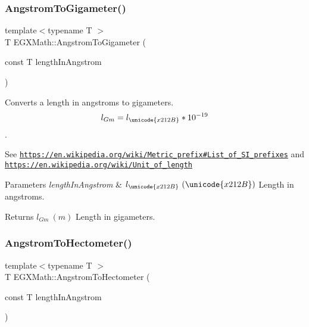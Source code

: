 \subsubsection{\texorpdfstring{Angstrom\+To\+Gigameter()}{AngstromToGigameter()}}
{\footnotesize\ttfamily template$<$typename T $>$ \\
T E\+G\+X\+Math\+::\+Angstrom\+To\+Gigameter (\begin{DoxyParamCaption}\item[{const T}]{length\+In\+Angstrom }\end{DoxyParamCaption})}



Converts a length in angstroms to gigameters. \[ l_{Gm}=l_{\unicode{x212B}} * 10^{-19} \]. 

See \href{https://en.wikipedia.org/wiki/Metric_prefix#List_of_SI_prefixes}{\tt https\+://en.\+wikipedia.\+org/wiki/\+Metric\+\_\+prefix\#\+List\+\_\+of\+\_\+\+S\+I\+\_\+prefixes} and \href{https://en.wikipedia.org/wiki/Unit_of_length}{\tt https\+://en.\+wikipedia.\+org/wiki/\+Unit\+\_\+of\+\_\+length} 
\begin{DoxyParams}{Parameters}
{\em length\+In\+Angstrom} & $ l_{\unicode{x212B}}\ (\unicode{x212B})$ Length in angstroms. \\
\hline
\end{DoxyParams}
\begin{DoxyReturn}{Returns}
$ l_{Gm}\ (m)$ Length in gigameters. 
\end{DoxyReturn}
\mbox{\label{group___e_g_x_math-_conversions-_length_conversions-_non-_s_i-_angstrom-_s_i_ga0f6fad35867be49511009edfdb4b7a0a}} 
\subsubsection{\texorpdfstring{Angstrom\+To\+Hectometer()}{AngstromToHectometer()}}
{\footnotesize\ttfamily template$<$typename T $>$ \\
T E\+G\+X\+Math\+::\+Angstrom\+To\+Hectometer (\begin{DoxyParamCaption}\item[{const T}]{length\+In\+Angstrom }\end{DoxyParamCaption})}



